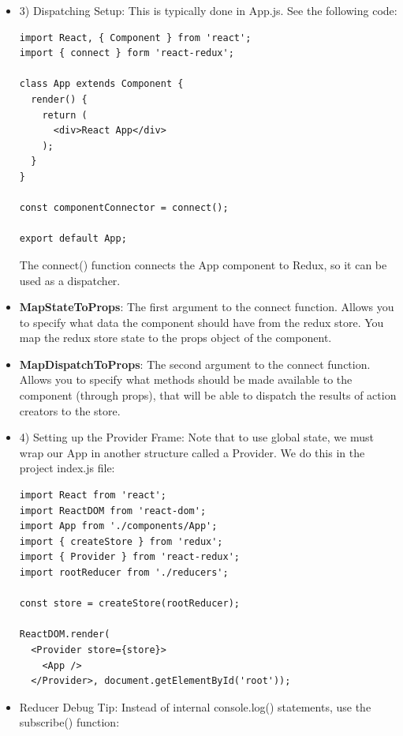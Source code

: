 \documentclass[8pt,a4paper]{extarticle}
\begin{document}
\begin{itemize}
\begin{verbatim}
\end{verbatim}

\item 3) Dispatching Setup: This is typically done in App.js. See the following code:

\begin{verbatim}
import React, { Component } from 'react';
import { connect } form 'react-redux';

class App extends Component {
  render() {
    return (
      <div>React App</div>
    );
  }
}

const componentConnector = connect();

export default App;
\end{verbatim}

The connect() function connects the App component to Redux, so it can be used as a dispatcher.

\item \textbf{MapStateToProps}: The first argument to the connect function. Allows you to specify what data the component should have from the redux store. You map the redux store state to the props object of the component.

\item \textbf{MapDispatchToProps}: The second argument to the connect function. Allows you to specify what methods should be made available to the component (through props), that will be able to dispatch the results of action creators to the store.



\item 4) Setting up the Provider Frame: Note that to use global state, we must wrap our App in another structure called a Provider. We do this in the project index.js file:

\begin{verbatim}
import React from 'react';
import ReactDOM from 'react-dom';
import App from './components/App';
import { createStore } from 'redux';
import { Provider } from 'react-redux'; 
import rootReducer from './reducers';

const store = createStore(rootReducer);

ReactDOM.render(
  <Provider store={store}>
    <App />
  </Provider>, document.getElementById('root'));

\end{verbatim}


\item Reducer Debug Tip: Instead of internal console.log() statements, use the subscribe() function:


\end{itemize}
\end{document}
